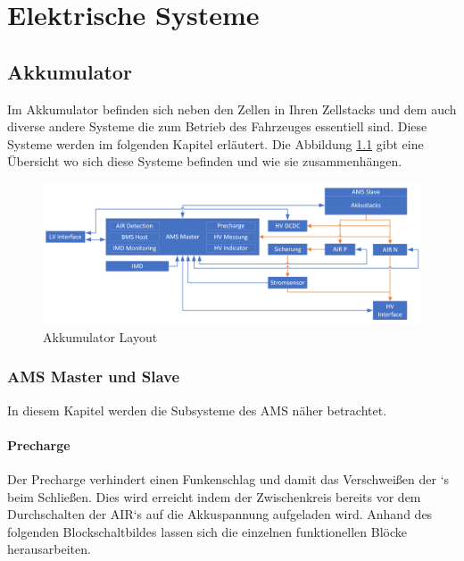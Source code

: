 
\chapter{Elektrische Systeme}
\FloatBarrier
\section{Akkumulator}
Im Akkumulator befinden sich neben den Zellen in Ihren Zellstacks und dem  auch diverse andere Systeme die zum Betrieb des Fahrzeuges essentiell sind. Diese Systeme werden im folgenden Kapitel erläutert. Die Abbildung \ref{fig:accumulator-layout} gibt eine Übersicht wo sich diese Systeme befinden und wie sie zusammenhängen.

\begin{figure}
	\centering
	\includegraphics[width=1\linewidth]{"bilder/Accumulator Layout"}
	\caption{Akkumulator Layout}
	\label{fig:accumulator-layout}
\end{figure}

\FloatBarrier
\subsection{\ac{AMS} Master und Slave}
In diesem Kapitel werden die Subsysteme des \ac{AMS} näher betrachtet.
\FloatBarrier

\subsubsection{Precharge}
Der Precharge verhindert einen Funkenschlag und damit das Verschweißen der `s beim Schließen. Dies wird erreicht indem der Zwischenkreis bereits vor dem Durchschalten der \ac{AIR}`s auf die Akkuspannung aufgeladen wird. Anhand des folgenden Blockschaltbildes lassen sich die einzelnen funktionellen Blöcke herausarbeiten.

